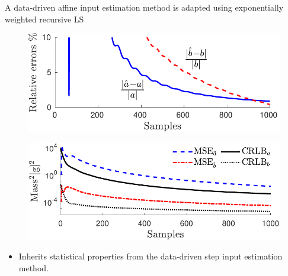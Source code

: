\documentclass[presentation]{beamer}
\begin{document}
\begin{frame}[label={slide:affine-input-estimation3}]{A data-driven affine input estimation method is adapted using exponentially weighted recursive LS}
\begin{figure}
\centering
\includegraphics[width=0.65\columnwidth]{./fig/Aff_Fig_4.pdf} 
\end{figure}
\begin{figure}
\centering
\hspace*{-3.5mm} \includegraphics[width=0.67\columnwidth]{./fig/Aff_Fig_6.pdf} 
\end{figure}
\begin{itemize}
	\color{blue}
	\item Inherits statistical properties from \linebreak the data-driven step input estimation method. 
\end{itemize}
\end{frame}
\end{document}
